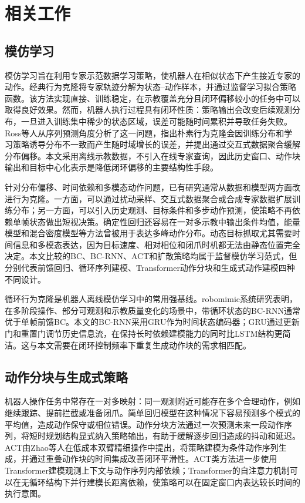 \chapter{相关工作}\label{chap:related-work}

\section{模仿学习}

模仿学习旨在利用专家示范数据学习策略，使机器人在相似状态下产生接近专家的动作。经典行为克隆将专家轨迹分解为状态--动作样本，并通过监督学习拟合策略函数\citep{pomerleau1989alvinn,argall2009survey}。该方法实现直接、训练稳定，在示教覆盖充分且闭环偏移较小的任务中可以取得良好效果。然而，机器人执行过程具有闭环性质：策略输出会改变后续观测分布，一旦进入训练集中稀少的状态区域，误差可能随时间累积并导致任务失败。Ross等人从序列预测角度分析了这一问题，指出朴素行为克隆会因训练分布和学习策略诱导分布不一致而产生随时域增长的误差，并提出通过交互式数据聚合缓解分布偏移\citep{ross2010efficient,ross2011reduction}。本文采用离线示教数据，不引入在线专家查询，因此历史窗口、动作块输出和目标中心化表示是降低闭环偏移的主要结构性手段。

针对分布偏移、时间依赖和多模态动作问题，已有研究通常从数据和模型两方面改进行为克隆。一方面，可以通过扰动采样、交互式数据聚合或合成专家数据扩展训练分布；另一方面，可以引入历史观测、目标条件和多步动作预测，使策略不再依赖单帧状态做出短视决策。确定性回归还容易在一对多示教中输出条件均值，能量模型和混合密度模型等方法曾被用于表达多峰动作分布\citep{bishop1994mixture,florence2022implicit}。动态目标抓取尤其需要时间信息和多模态表达，因为目标速度、相对相位和闭爪时机都无法由静态位置完全决定。本文比较的BC、BC-RNN、ACT和扩散策略均属于监督模仿学习范式，但分别代表前馈回归、循环序列建模、Transformer动作分块和生成式动作建模四种不同设计。

循环行为克隆是机器人离线模仿学习中的常用强基线。robomimic系统研究表明，在多阶段操作、部分可观测和示教质量变化的场景中，带循环状态的BC-RNN通常优于单帧前馈BC\citep{mandlekar2021matters}。本文的BC-RNN采用GRU作为时间状态编码器；GRU通过更新门和重置门调节历史信息流，在保持长时依赖建模能力的同时比LSTM结构更简洁\citep{cho2014learning,chung2014empirical}。这与本文需要在闭环控制频率下重复生成动作块的需求相匹配。

\section{动作分块与生成式策略}

机器人操作任务中常存在一对多映射：同一观测附近可能存在多个合理动作，例如继续跟踪、提前拦截或准备闭爪。简单回归模型在这种情况下容易预测多个模式的平均值，造成动作保守或相位错误。动作分块方法通过一次预测未来一段动作序列，将短时规划结构显式纳入策略输出，有助于缓解逐步回归造成的抖动和延迟。ACT由Zhao等人在低成本双臂精细操作中提出，将策略建模为条件动作序列生成，并通过重叠动作块的时间集成改善闭环平滑性\citep{zhao2023learning}。ACT类方法进一步使用Transformer建模观测上下文与动作序列内部依赖；Transformer的自注意力机制可以在无循环结构下并行建模长距离依赖\citep{vaswani2017attention}，使策略可以在固定窗口内表达较长时间的执行意图。

